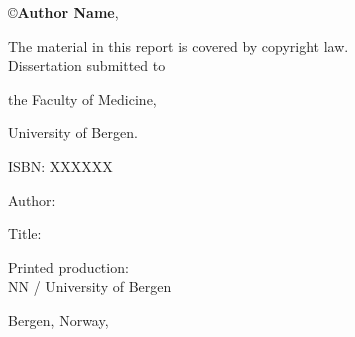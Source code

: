 \documentclass[12pt]{book} %
\title{
    {\fontsize{20}{24}{\color{Maroon}\spaceduppercaps{Thesis Title Goes Here }}}
	\author{
        \textbf{Doctoral Dissertation by}\\ 
        \textbf{Author Name}\vspace{0.5cm}\\
		Thesis submitted for\\ 
        the degree of Philosophiae Doctor (PhD)\\
        in\\ 
        {\fontsize{12}{14}Computational Medicine and Medical AI}\vspace{0.5cm}\\
		\texttt{[image: logos/uglo2.pdf]}\vspace{0.5cm}\\
        Department of Biomedicine,\\ 
		Faculty of Medicine \vspace{0.3cm}\\
		University of Bergen
	}
	\date{Month day, year}
}
\begin{document}
\newcommand{\TextSize}{13}
\newcommand{\BaseLineSkip}{15}
\fontsize{\TextSize}{\BaseLineSkip}
\selectfont

\cleardoublepage
\maketitle

\normalsize\vspace*{12cm}
\begin{minipage}{13cm}

\copyright{\textbf{Author Name}}, \textbf{ \the\year{}}\vspace{2ex}  %

The material in this report is covered by copyright law.\vspace{3ex}\\

Dissertation submitted to

the Faculty of Medicine,

University of Bergen.\vspace{3ex}

ISBN: XXXXXX\vspace{3ex} %


Author: 

Title: \vspace{4ex}

Printed production: \\
NN / University of Bergen \vspace{3ex}

Bergen, Norway, \the\year{}
\end{minipage}

\ifDraftMargin
\fi


\end{document}
